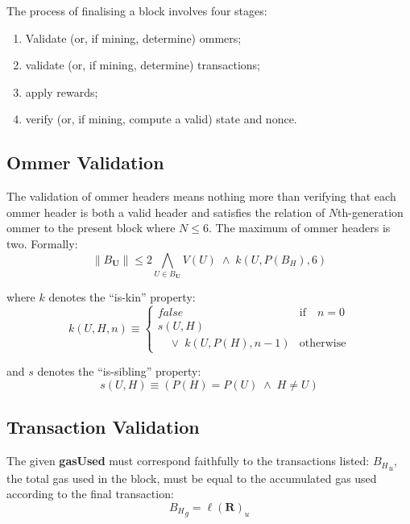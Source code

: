 \documentclass[9pt,oneside]{amsart}
\begin{document}
\begin{multicols}{2}
The process of finalising a block involves four stages:

\begin{enumerate}
\item Validate (or, if mining, determine) ommers;
\item validate (or, if mining, determine) transactions;
\item apply rewards;
\item verify (or, if mining, compute a valid) state and nonce.
\end{enumerate}

\subsection{Ommer Validation}

The validation of ommer headers means nothing more than verifying that each ommer header is both a valid header and satisfies the relation of $N$th-generation ommer to the present block where $N \leq 6$. The maximum of ommer headers is two. Formally:
\begin{equation}
\lVert B_\mathbf{U} \rVert \leqslant 2 \bigwedge_{U \in B_\mathbf{U}} V(U) \; \wedge \; k(U, P(B_H), 6)
\end{equation}

where $k$ denotes the ``is-kin'' property:
\begin{equation}
k(U, H, n) \equiv \begin{cases} false & \text{if} \quad n = 0 \\ 
s(U, H) &\\
\quad \vee \; k(U, P(H), n - 1) & \text{otherwise}
\end{cases}
\end{equation}

and $s$ denotes the ``is-sibling'' property:
\begin{equation}
s(U, H) \equiv (P(H) = P(U)\; \wedge \; H \neq U)
\end{equation}

\subsection{Transaction Validation}


The given \textbf{gasUsed} must correspond faithfully to the transactions listed: ${B_H}_u$, the total gas used in the block, must be equal to the accumulated gas used according to the final transaction:
\begin{equation}
{B_H}_g = \ell(\mathbf{R})_u
\end{equation}


\end{multicols}
\end{document}
